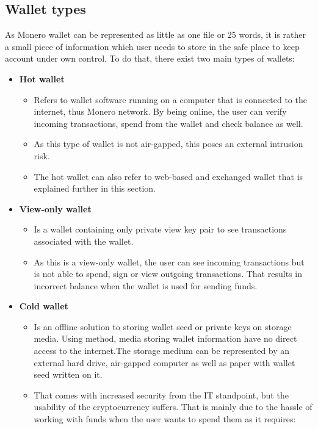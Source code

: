 \documentclass[
  printed, %
  table,   %
  nolof,     %
  nolot,     %
           oneside, color
]{fithesis3}
\begin{document}
\subsection{Wallet types}
As Monero wallet can be represented as little as one file or 25 words, it is rather a small piece of information which user needs to store in the safe place to keep account under own control. To do that, there exist two main types of wallets:
\begin{itemize}\itemsep0em
\item \textbf{Hot wallet}
\begin{itemize}\itemsep0em
\item Refers to wallet software running on a computer that is connected to the internet, thus Monero network. By being online, the user can verify incoming transactions, spend from the wallet and check balance as well.
\item As this type of wallet is not air-gapped, this poses an external intrusion risk.
\item The hot wallet can also refer to web-based and exchanged wallet that is explained further in this section.
\end{itemize}
\item \textbf{View-only wallet}
\begin{itemize}\itemsep0em
\item Is a wallet containing only private view key pair to see transactions associated with the wallet.
\item As this is a view-only wallet, the user can see incoming transactions but is not able to spend, sign or view outgoing transactions. That results in incorrect balance when the wallet is used for sending funds.
\end{itemize}
\item \textbf{Cold wallet}
\begin{itemize}\itemsep0em
\item Is an offline solution to storing wallet seed or private keys on storage media. Using method, media storing wallet information have no direct access to the internet.The storage medium can be represented by an external hard drive, air-gapped computer as well as paper with wallet seed written on it.
\item That comes with increased security from the IT standpoint, but the usability of the cryptocurrency suffers. That is mainly due to the hassle of working with funds when the user wants to spend them as it requires:

\end{itemize}
\end{itemize}
\end{document}
